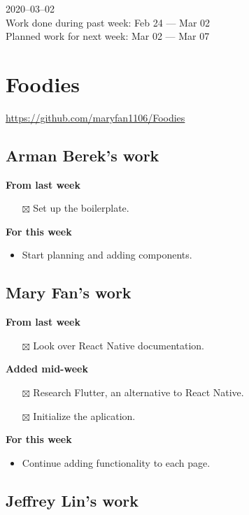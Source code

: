 \documentclass[12pt,letterpaper]{article}
\newcommand{\done}{$\boxtimes$}
\begin{document}
2020--03--02 \\
Work done during past week: Feb 24 --- Mar 02 \\
Planned work for next week: Mar 02 --- Mar 07

\section*{Foodies}
\url{https://github.com/maryfan1106/Foodies}

\subsection*{Arman Berek's work}

\textbf{From last week}
\begin{itemize}
  \item[\done] Set up the boilerplate.
\end{itemize}


\textbf{For this week}
\begin{itemize}
  \item Start planning and adding components.
\end{itemize}


\subsection*{Mary Fan's work}

\textbf{From last week}
\begin{itemize}
  \item[\done] Look over React Native documentation.
\end{itemize}

\textbf{Added mid-week}
\begin{itemize}
  \item[\done] Research Flutter, an alternative to React Native.
  \item[\done] Initialize the aplication.
\end{itemize}

\textbf{For this week}
\begin{itemize}
  \item Continue adding functionality to each page.
\end{itemize}


\subsection*{Jeffrey Lin's work}
\end{document}
